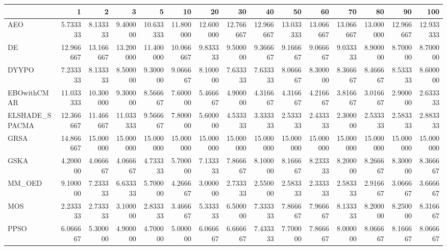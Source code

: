 \begin{tabular}{lrrrrrrrrrrrrrr}
\toprule
{} &        1   &        2   &        3   &        5   &        10  &        20  &        30  &        40  &        50  &        60  &        70  &        80  &        90  &        100 \\
\midrule
AEO            &   5.733333 &   8.133333 &   9.400000 &  10.633333 &  11.800000 &  12.600000 &  12.766667 &  12.966667 &  13.033333 &  13.066667 &  13.066667 &  13.000000 &  12.966667 &  12.933333 \\
DE             &  12.966667 &  13.166667 &  13.200000 &  11.400000 &  10.066667 &   9.833333 &   9.500000 &   9.366667 &   9.166667 &   9.066667 &   9.033333 &   8.900000 &   8.700000 &   8.700000 \\
DYYPO          &   7.233333 &   8.133333 &   8.500000 &   9.300000 &   9.066667 &   8.100000 &   7.633333 &   7.633333 &   8.066667 &   8.300000 &   8.366667 &   8.466667 &   8.533333 &   8.600000 \\
EBOwithCMAR    &  11.033333 &  10.300000 &   9.300000 &   8.566667 &   7.600000 &   5.466667 &   4.900000 &   4.316667 &   4.316667 &   4.216667 &   3.816667 &   3.016667 &   2.900000 &   2.633333 \\
ELSHADE\_SPACMA &  12.366667 &  11.466667 &  11.033333 &   9.566667 &   7.800000 &   5.600000 &   4.533333 &   3.333333 &   2.533333 &   2.433333 &   2.300000 &   2.533333 &   2.583333 &   2.883333 \\
GRSA           &  14.866667 &  15.000000 &  15.000000 &  15.000000 &  15.000000 &  15.000000 &  15.000000 &  15.000000 &  15.000000 &  15.000000 &  15.000000 &  15.000000 &  15.000000 &  15.000000 \\
GSKA           &   4.200000 &   4.066667 &   4.066667 &   4.733333 &   5.700000 &   7.133333 &   7.866667 &   8.100000 &   8.166667 &   8.233333 &   8.200000 &   8.266667 &   8.300000 &   8.366667 \\
MM\_OED         &   9.100000 &   7.233333 &   6.633333 &   5.700000 &   4.266667 &   3.000000 &   2.733333 &   2.550000 &   2.583333 &   2.333333 &   2.583333 &   2.916667 &   3.066667 &   3.666667 \\
MOS            &   2.233333 &   2.733333 &   3.100000 &   2.833333 &   3.466667 &   5.333333 &   6.500000 &   7.333333 &   7.866667 &   7.966667 &   8.133333 &   8.200000 &   8.250000 &   8.316667 \\
PPSO           &   6.066667 &   5.300000 &   4.900000 &   4.700000 &   5.000000 &   6.066667 &   6.666667 &   7.433333 &   7.700000 &   7.866667 &   8.000000 &   8.066667 &   8.166667 &   8.066667 \\

\end{tabular}
